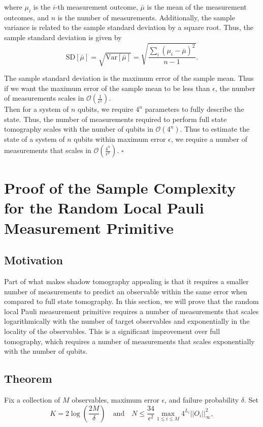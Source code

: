 \documentclass[12pt]{article}
\begin{document}
    where $\mu_i$ is the $i$-th measurement outcome, $\bar{\mu}$ is the mean of the measurement outcomes, and $n$ is the number of measurements. Additionally, the sample variance is related to the sample standard deviation by a square root. Thus, the sample standard deviation is given by
    \begin{equation}
        \text{SD}[\bar{\mu}] = \sqrt{\text{Var}[\bar{\mu}]} = \sqrt{\frac{\sum_i (\mu_i - \bar{\mu})^2}{n-1}}.
    \end{equation}

    The sample standard deviation is the maximum error of the sample mean. Thus if we want the maximum error of the sample mean to be less than $\epsilon$, the number of measurements scales in $\mathcal{O}\left( \frac{1}{\epsilon^2} \right)$.\\
    Then for a system of $n$ qubits, we require $4^n$ parameters to fully describe the state. Thus, the number of measurements required to perform full state tomography scales with the number of qubits in $\mathcal{O}\left( 4^n \right)$. Thus to estimate the state of a system of $n$ qubits within maximum error $\epsilon$, we require a number of measurements that scales in $\mathcal{O}\left( \frac{4^n}{\epsilon^2} \right)$.
    \hfill $\square$


    \section{Proof of the Sample Complexity for the Random Local Pauli Measurement Primitive}
    \subsection{Motivation}
    Part of what makes shadow tomography appealing is that it requires a smaller number of measurements to predict an observable within the same error when compared to full state tomography. In this section, we will prove that the random local Pauli measurement primitive requires a number of measurements that scales logarithmically with the number of target observables and exponentially in the locality of the observables. This is a significant improvement over full tomography, which requires a number of measurements that scales exponentially with the number of qubits. 

    \subsection{Theorem}
    Fix a collection of $M$ observables, maximum error $\epsilon$, and failure probability $\delta$. Set 
    \begin{equation*}
        K = 2 \log{\left(\frac{2M}{\delta}\right)} \quad \text{and} \quad N \leq \frac{34}{\epsilon^2} \max_{1 \leq i \leq M} 4^{L_i} ||O_i||^2_\infty,
    \end{equation*}
\end{document}
